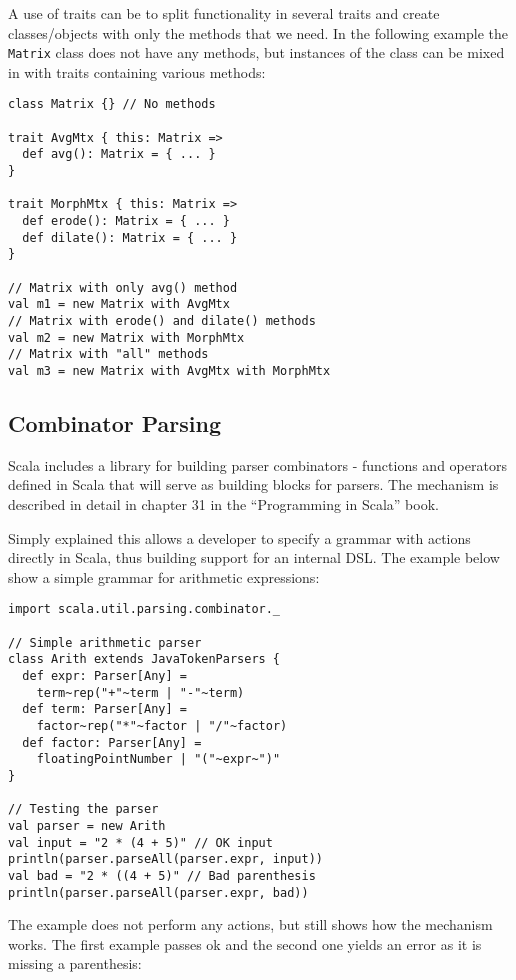 \documentclass[a4paper,english]{report}
\begin{document}
A use of traits can be to split functionality in several traits and
create classes/objects with only the methods that we need. In the
following example the \texttt{Matrix} class does not have any methods,
but instances of the class can be mixed in with traits containing
various methods:

\begin{lstlisting}
class Matrix {} // No methods

trait AvgMtx { this: Matrix =>
  def avg(): Matrix = { ... }
}

trait MorphMtx { this: Matrix =>
  def erode(): Matrix = { ... }
  def dilate(): Matrix = { ... }
}

// Matrix with only avg() method
val m1 = new Matrix with AvgMtx
// Matrix with erode() and dilate() methods
val m2 = new Matrix with MorphMtx
// Matrix with "all" methods
val m3 = new Matrix with AvgMtx with MorphMtx
\end{lstlisting}

\subsection{Combinator Parsing}
\label{sec:combparse}

Scala includes a library for building parser combinators - functions
and operators defined in Scala that will serve as building blocks for
parsers. The mechanism is described in detail in chapter 31 in the
``Programming in Scala'' book\cite{ode08}.

Simply explained this allows a developer to specify a grammar with
actions directly in Scala, thus building support for an internal
DSL. The example below show a simple grammar for arithmetic
expressions:

\begin{lstlisting}
import scala.util.parsing.combinator._ 

// Simple arithmetic parser
class Arith extends JavaTokenParsers { 
  def expr: Parser[Any] =
    term~rep("+"~term | "-"~term) 
  def term: Parser[Any] =
    factor~rep("*"~factor | "/"~factor) 
  def factor: Parser[Any] =
    floatingPointNumber | "("~expr~")" 
}

// Testing the parser
val parser = new Arith
val input = "2 * (4 + 5)" // OK input
println(parser.parseAll(parser.expr, input))
val bad = "2 * ((4 + 5)" // Bad parenthesis
println(parser.parseAll(parser.expr, bad))
\end{lstlisting}

The example does not perform any actions, but still shows how the
mechanism works. The first example passes ok and the second one yields
an error as it is missing a parenthesis:
\end{document}
